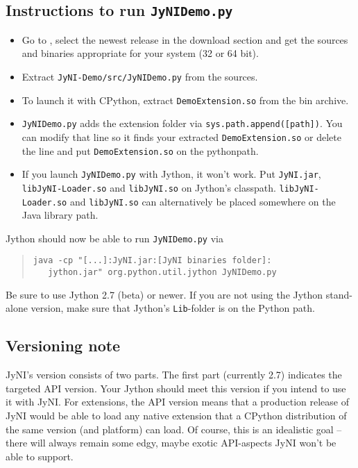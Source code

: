 \documentclass[letterpaper,compsoc,twoside]{IEEEtran}
\begin{document}
\subsection{Instructions to run \texttt{JyNIDemo.py}\label{instructions-to-run-jynidemo-py}}
\begin{itemize}

\item 

Go to \cite{JyNI}, select the newest release in the download section and get the sources and binaries appropriate for your system (32 or 64 bit).
\item 

Extract \texttt{JyNI-Demo/src/JyNIDemo.py} from the sources.
\item 

To launch it with CPython, extract \texttt{DemoExtension.so} from the bin archive.
\item 

\texttt{JyNIDemo.py} adds the extension folder via \texttt{sys.path.append({[}path{]})}.
You can modify that line so it finds your extracted \texttt{DemoExtension.so} or delete the line and put
\texttt{DemoExtension.so} on the pythonpath.
\item 

If you launch \texttt{JyNIDemo.py} with Jython, it won't work.
Put \texttt{JyNI.jar}, \texttt{libJyNI-Loader.so} and \texttt{libJyNI.so} on Jython's classpath.
\texttt{libJyNI-Loader.so} and \texttt{libJyNI.so} can alternatively be placed somewhere on the Java library path.
\end{itemize}


Jython should now be able to run \texttt{JyNIDemo.py} via\begin{quote}\begin{verbatim}
java -cp "[...]:JyNI.jar:[JyNI binaries folder]:
   jython.jar" org.python.util.jython JyNIDemo.py
\end{verbatim}

\end{quote}
Be sure to use Jython 2.7 (beta) or newer. If you are not using the Jython stand-alone version, make sure
that Jython's \texttt{Lib}-folder is on the Python path.

\subsection{Versioning note\label{versioning-note}}


JyNI's version consists of two parts. The first part (currently 2.7) indicates the targeted API version. Your Jython
should meet this version if you intend to use it with JyNI. For extensions, the API version means that
a production release of JyNI would be able to load any native extension that a CPython distribution of the
same version (and platform) can load.
Of course, this is an idealistic goal – there will always remain some edgy, maybe exotic API-aspects JyNI won't be
able to support.
\end{document}
